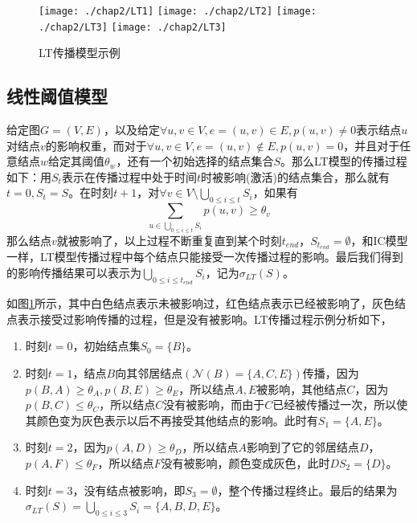 \begin{figure}[H]
\centering%
	{\texttt{[image: ./chap2/LT1]}}
	\hspace{1mm}%
	{\texttt{[image: ./chap2/LT2]}}
	\hspace{1mm}%
	{\texttt{[image: ./chap2/LT3]}}
	\hspace{1mm}%
	{\texttt{[image: ./chap2/LT3]}}
	\caption{LT传播模型示例}
	\label{fig:LT-inf-diffusion}
\end{figure}


\subsection{线性阈值模型}
\label{sec:LT-model-desc}
给定图$G=(V, E)$，以及给定$\forall u, v \in V, e=(u, v) \in E, p(u, v) \neq 0$表示结点$u$对结点$v$的影响权重，而对于$\forall u, v \in V, e=(u, v) \notin E, p(u, v)=0$，并且对于任意结点$w$给定其阈值$\theta_{w}$，还有一个初始选择的结点集合$S$。那么LT模型的传播过程如下：用$S_{t}$表示在传播过程中处于时间$t$时被影响(激活)的结点集合，那么就有$t=0, S_{t}=S$。在时刻$t+1$，对$\forall v \in V\setminus \bigcup_{0 \leq i \leq t}S_{i}$，如果有
\begin{displaymath} 
	{\sum_{u \in \bigcup_{0 \leq i \leq t}S_{i}}p(u,v) \geq \theta_{v}} 
\end{displaymath}
那么结点$v$就被影响了，以上过程不断重复直到某个时刻$t_{end}$，$S_{t_{end}}=\emptyset$，和IC模型一样，LT模型传播过程中每个结点只能接受一次传播过程的影响。最后我们得到的影响传播结果可以表示为$\bigcup_{0 \leq i \leq t_{end}}S_{i}$，记为$\sigma_{LT}(S)$。


如图\ref{fig:LT-inf-diffusion}所示，其中白色结点表示未被影响过，红色结点表示已经被影响了，灰色结点表示接受过影响传播的过程，但是没有被影响。LT传播过程示例分析如下，
\begin{enumerate}
\item 时刻$t=0$，初始结点集$S_{0}=\{B\}$。
\item 时刻$t=1$，结点$B$向其邻居结点$(\mathcal{N}(B)=\{A, C, E\})$传播，因为$p(B,A) \geq \theta_{A}, p(B,E) \geq \theta_{E}$，所以结点$A, E$被影响，其他结点$C$，因为$p(B,C) \leq \theta_{C}$，所以结点$C$没有被影响，而由于$C$已经被传播过一次，所以使其颜色变为灰色表示以后不再接受其他结点的影响。此时有$S_{1}=\{A, E\}$。
\item 时刻$t=2$，因为$p(A,D) \geq \theta_{D}$，所以结点$A$影响到了它的邻居结点$D$，$p(A, F) \leq \theta_{F}$，所以结点$F$没有被影响，颜色变成灰色，此时$DS_{2}=\{D\}$。
\item 时刻$t=3$，没有结点被影响，即$S_{3}=\emptyset$，整个传播过程终止。最后的结果为$\sigma_{LT}(S)=\bigcup_{0 \leq i \leq 3}S_{i}=\{A, B, D, E\}$。
\end{enumerate}


